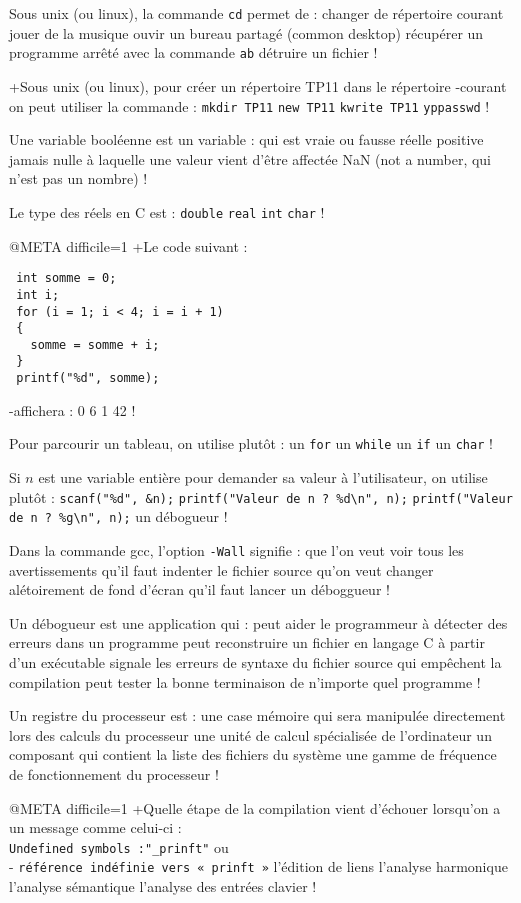 Sous unix (ou linux), la commande \verb|cd| permet de :
 changer de répertoire courant
 jouer de la musique
 ouvir un bureau partagé (common desktop)
 récupérer un programme arrêté avec la commande \verb|ab|
 détruire un fichier
!

+Sous unix (ou linux), pour créer un répertoire TP11 dans le répertoire
-courant on peut utiliser la commande :
 \verb+mkdir TP11+
 \verb+new TP11+
 \verb+kwrite TP11+
 \verb+yppasswd+
!

Une variable booléenne est un variable :
 qui est vraie ou fausse
 réelle positive
 jamais nulle
 à laquelle une valeur vient d'être affectée
 NaN (not a number, qui n'est pas un nombre)
! 

Le type des réels en C est :
 \verb+double+
 \verb+real+
 \verb+int+
 \verb+char+
!

@META difficile=1
+Le code suivant :
 \begin{verbatim}
 int somme = 0;
 int i;
 for (i = 1; i < 4; i = i + 1)
 {
   somme = somme + i;
 }
 printf("%d", somme); 
 \end{verbatim}
-affichera :
 0
 6
 1
 42
!

Pour parcourir un tableau, on utilise plutôt :
 un \verb|for|
 un \verb|while|
 un \verb|if|
 un \verb|char|
!

Si $n$ est une variable entière pour demander sa valeur à l'utilisateur, on utilise plutôt :
 \verb+scanf("%d", &n);+
 \verb+printf("Valeur de n ? %d\n", n);+
 \verb+printf("Valeur de n ? %g\n", n);+
  un débogueur
!

Dans la commande gcc, l'option \verb|-Wall| signifie :
 que l'on veut voir tous les avertissements
 qu'il faut indenter le fichier source
 qu'on veut changer alétoirement de fond d'écran
 qu'il faut lancer un déboggueur
!

Un débogueur est une application qui :
 peut aider le programmeur à détecter des erreurs dans un programme
 peut reconstruire un fichier en langage C à partir d'un exécutable
 signale les erreurs de syntaxe du fichier source qui empêchent la compilation 
 peut tester la bonne terminaison de n'importe quel programme
!

Un registre du processeur est :
 une case mémoire qui sera manipulée directement lors des calculs du processeur
 une unité de calcul spécialisée de l'ordinateur
 un composant qui contient la liste des fichiers du système
 une gamme de fréquence de fonctionnement du processeur
!

@META difficile=1
+Quelle étape de la compilation vient d'échouer lorsqu'on a un message
 comme celui-ci : \\
 \verb+Undefined symbols :"_prinft"+ ou \\
- \verb+référence indéfinie vers « prinft »+
 l'édition de liens
 l'analyse harmonique
 l'analyse sémantique
 l'analyse des entrées clavier
!

